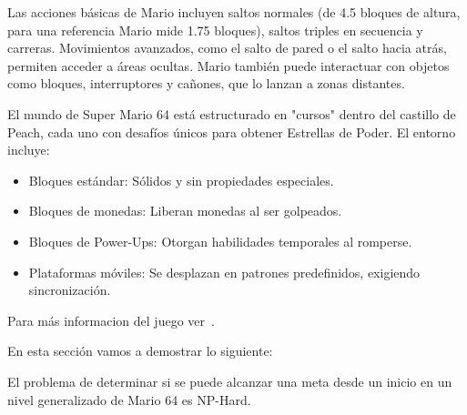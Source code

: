 \documentclass[runningheads]{llncs}
\begin{document}
Las acciones básicas de Mario incluyen saltos normales (de 4.5 bloques de altura, para una referencia Mario mide 1.75 bloques), saltos triples en secuencia y carreras. Movimientos avanzados, como el salto de pared
o el salto hacia atrás, permiten acceder a áreas ocultas. Mario también puede interactuar con objetos como bloques, interruptores y cañones, que lo lanzan a zonas distantes.

El mundo de Super Mario 64 está estructurado en "cursos" dentro del castillo de Peach, cada uno con desafíos únicos para obtener Estrellas de Poder. El entorno incluye:  
\begin{itemize}
\item Bloques estándar: Sólidos y sin propiedades especiales.  
\item Bloques de monedas: Liberan monedas al ser golpeados.  
\item Bloques de Power-Ups: Otorgan habilidades temporales al romperse.  
\item Plataformas móviles: Se desplazan en patrones predefinidos, exigiendo sincronización.
\end{itemize}

Para más informacion del juego ver~\cite{ref_url2}.

En esta sección vamos a demostrar lo siguiente:

\begin{theorem}
El problema de determinar si se puede alcanzar una meta desde un inicio en un nivel generalizado de Mario 64 es NP-Hard.
\end{theorem}
\end{document}
